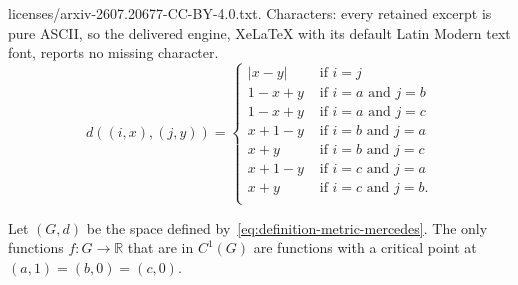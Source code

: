 \documentclass[10pt,a4paper]{amsart}
\begin{document}
licenses/arxiv-2607.20677-CC-BY-4.0.txt. Characters: every retained excerpt is pure ASCII, so the delivered engine, XeLaTeX with its default Latin Modern text font, reports no missing character.
\begin{equation}\label{eq:definition-metric-mercedes}
  d((i, x), (j, y)) =
  \left\{\begin{array}{ll}
    |x - y|   & \text{ if } i = j                     \\
    1 - x + y & \text{ if } i = a \text{ and } j = b  \\
    1 - x + y & \text{ if } i = a \text{ and } j = c  \\
    x + 1 - y & \text{ if } i = b \text{ and } j = a  \\
    x + y     & \text{ if } i = b \text{ and } j = c  \\
    x + 1 - y & \text{ if } i = c \text{ and } j = a  \\
    x + y     & \text{ if } i = c \text{ and } j = b. \\
  \end{array}\right.
\end{equation}

\begin{proposition}
  Let $(G, d)$ be the space defined by~\eqref{eq:definition-metric-mercedes}.
  The only functions $f:G \to \mathbb{R}$ that are in $C^1(G)$  are 
  functions with a critical point at $(a, 1) = (b, 0) = (c, 0)$. 
\end{proposition}
\end{document}
